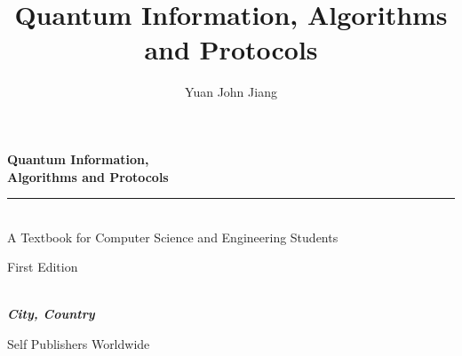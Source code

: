 \documentclass{book}
\title{Quantum Information, Algorithms and Protocols}
\author{Yuan John Jiang}
\makeatletter
\newcommand{\booksubtitle}{A Textbook for Computer Science and Engineering Students}
\newcommand{\authorsubtitle}{City, Country}
\newcommand{\bookauthor}{\@author}
\makeatother
\begin{document}
\frontmatter



\begin{titlepage}
\begin{flushleft}

\textbf{\fontsize{38}{50}\selectfont Quantum Information,\\Algorithms and Protocols}

\par\noindent\rule{\textwidth}{2pt}\\
\booksubtitle


\begin{flushright}
\Large First Edition
\end{flushright}

\vspace{\fill}

\textbf{\large \bookauthor}\\[3.5pt]
\textbf{\large \textit{\authorsubtitle}}

\vspace{\fill}

\begin{center}
\small{Self Publishers Worldwide\\
}
\end{center}

\end{flushleft}
\end{titlepage}
\restoregeometry

\thispagestyle{empty}
\end{document}
